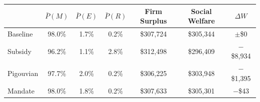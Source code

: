 \begin{tabular}{lcccccc}
\toprule
 & $\bar P(M)$ & $\bar P(E)$ & $\bar P(R)$ & Firm Surplus & Social Welfare & $\Delta W$ \\
\midrule
Baseline & 98.0\% & 1.7\% & 0.2\% & \$307,724 & \$305,344 & $\pm$\$0 \\
Subsidy & 96.2\% & 1.1\% & 2.8\% & \$312,498 & \$296,409 & $-$\$8,934 \\
Pigouvian & 97.7\% & 2.0\% & 0.2\% & \$306,225 & \$303,948 & $-$\$1,395 \\
Mandate & 98.0\% & 1.8\% & 0.2\% & \$307,633 & \$305,301 & $-$\$43 \\
\bottomrule
\end{tabular}
